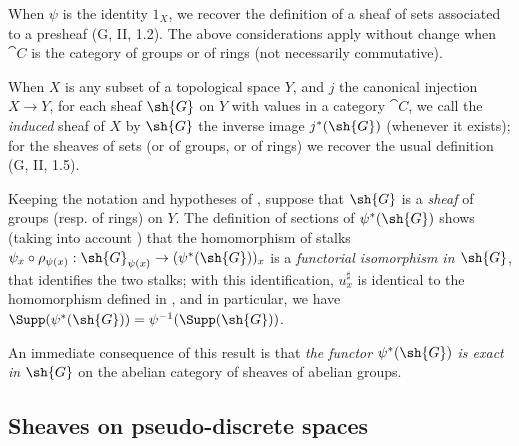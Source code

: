 \begin{env}[3.7.1]
When $\psi$ is the identity $1_X$, we recover the definition of a sheaf of sets
associated to a presheaf (G, II, 1.2). The above considerations apply without
change when $\cat{C}$ is the category of groups or of rings (not necessarily
commutative).

When $X$ is any subset of a topological space $Y$, and $j$ the canonical
injection $X\to Y$, for each sheaf $\sh{G}$ on $Y$ with values in a category
$\cat{C}$, we call the \emph{induced} sheaf of $X$ by $\sh{G}$ the inverse image
$j^*(\sh{G})$ (whenever it exists); for the sheaves of sets (or of groups, or of
rings) we recover the usual definition (G, II, 1.5).
\end{env}

\begin{env}[3.7.2]
\label{0.3.7.2}
Keeping the notation and hypotheses of , suppose that $\sh{G}$
is a \emph{sheaf} of groups (resp. of rings) on $Y$. The definition of sections
of $\psi^*(\sh{G})$  shows (taking into account ) that
the homomorphism of stalks
$\psi_x\circ\rho_{\psi(x)}:\sh{G}_{\psi(x)}\to(\psi^*(\sh{G}))_x$ is a
\emph{functorial isomorphism in $\sh{G}$}, that identifies the two stalks; with
this identification, $u_x^\sharp$ is identical to the homomorphism defined in
, and in particular, we have
$\Supp(\psi^*(\sh{G}))=\psi^{-1}(\Supp(\sh{G}))$.

An immediate consequence of this result is that \emph{the functor
$\psi^*(\sh{G})$ is exact in $\sh{G}$} on the abelian category of sheaves of
abelian groups.
\end{env}

\subsection{Sheaves on pseudo-discrete spaces}
\label{subsection:0.3.8}

